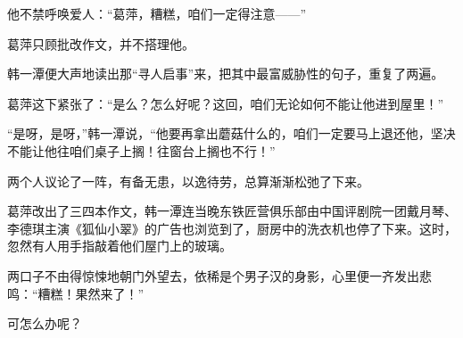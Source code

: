 \par 他不禁呼唤爱人：“葛萍，糟糕，咱们一定得注意——”
\par 葛萍只顾批改作文，并不搭理他。
\par 韩一潭便大声地读出那“寻人启事”来，把其中最富威胁性的句子，重复了两遍。
\par 葛萍这下紧张了：“是么？怎么好呢？这回，咱们无论如何不能让他进到屋里！”
\par “是呀，是呀，”韩一潭说，“他要再拿出蘑菇什么的，咱们一定要马上退还他，坚决不能让他往咱们桌子上搁！往窗台上搁也不行！”
\par 两个人议论了一阵，有备无患，以逸待劳，总算渐渐松弛了下来。
\par 葛萍改出了三四本作文，韩一潭连当晚东铁匠营俱乐部由中国评剧院一团戴月琴、李德琪主演《狐仙小翠》的广告也浏览到了，厨房中的洗衣机也停了下来。这时，忽然有人用手指敲着他们屋门上的玻璃。
\par 两口子不由得惊悚地朝门外望去，依稀是个男子汉的身影，心里便一齐发出悲鸣：“糟糕！果然来了！”
\par 可怎么办呢？



